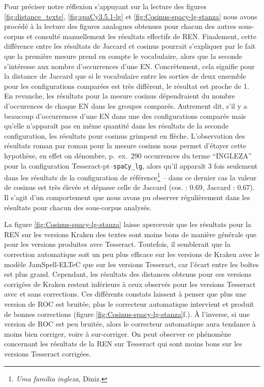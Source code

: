 Pour préciser notre réflexion s'appuyant sur la lecture des figures \ref{fig:distance_texte}, \ref{fig:spaCy3.5.1-lg} et \ref{fig:Cosinus-spacy-lg-stanza} nous avons procédé à la lecture des figures analogues obtenues pour chacun des autres sous-corpus et consulté manuellement les résultats effectifs de REN. Finalement, cette différence entre les résultats de Jaccard et cosinus pourrait s'expliquer par le fait que la première mesure prend en compte le vocabulaire, alors que la seconde s'intéresse aux nombre d'occurrences d'une EN. Concrètement, cela signifie pour la distance de Jaccard que si le vocabulaire entre les sorties de deux ensemble pour les configurations comparées est très différent, le résultat est proche de 1. 
En revanche, les résultats pour la mesure cosinus dépendraient du nombre d'occurences de chaque EN dans les groupes comparés. Autrement dit, s'il y a beaucoup d'occurrences d'une EN dans une des configurations comparée mais qu'elle n'apparaît pas en même quantité dans les résultats de la seconde configuration, les résultats pour cosinus grimpent en flèche. L'observation des résultats roman par roman pour la mesure cosinus nous permet d'étayer cette hypothèse, en effet on dénombre, p.\ ex.\, 290 occurrences du terme ``INGLEZA'' pour la configuration Tesseract-pt--\texttt{spaCy\_lg}, alors qu'il apparaît 3 fois seulement dans les résultats de la configuration de référence\footnote{\textit{Uma familia ingleza}, Diniz.} -- dans ce dernier cas la valeur de cosinus est très élevée et dépasse celle de Jaccard (cos. : 0.69, Jaccard : 0.67). Il s'agit d'un comportement que nous avons pu observer régulièrement dans les résultats pour chacun des sous-corpus analysés.

La figure \ref{fig:Cosinus-spacy-lg-stanza} laisse apercevoir que les résultats pour la REN sur les versions Kraken des textes sont moins bons de manière générale que pour les versions produites avec Tesseract. Toutefois, il semblerait que la correction automatique soit un peu plus efficace sur les versions de Kraken avec le modèle JamSpell-ELTeC que sur les versions Tesseract, car l'écart entre les boîtes est plus grand. Cependant, les résultats des distances obtenus pour ces versions corrigées de Kraken restent inférieurs à ceux observés pour les versions Tesseract avec et sans corrections. Ces différents constats laissent à penser que plus une version de ROC est bruitée, plus le correcteur automatique intervient et produit de bonnes corrections (figure \ref{fig:Cosinus-spacy-lg-stanza}f.). À l'inverse, si une version de ROC est peu bruitée, alors le correcteur automatique aura tendance à moins bien corriger, voire à sur-corriger. On peut observer ce phénomène concernant les résultats de la REN sur Tesseract qui sont moins bons sur les versions Tesseract corrigées. 

